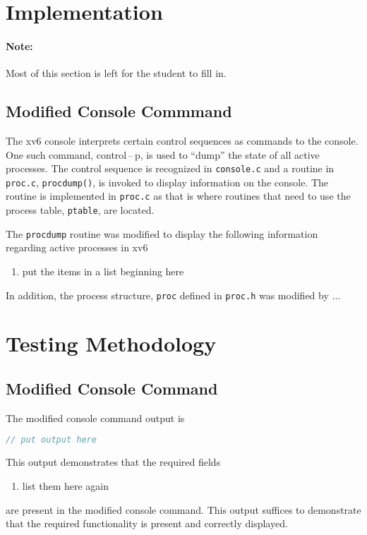 \documentclass[12pt,letterpaper]{report}
\begin{document}
	
	
	\section*{Implementation}
	
	\paragraph{Note:}Most of this section is left for the student to fill in.
	
	\subsection*{Modified Console Commmand}
	The xv6 console interprets certain control sequences as commands to the console. One such command, control\,--\,p, is used to ``dump'' the state of all active processes. The control sequence is recognized in \texttt{console.c} and a routine in \texttt{proc.c}, \texttt{procdump()}, is invoked to display information on the console. The routine is implemented in \texttt{proc.c} as that is where  routines that need to use the process table, \texttt{ptable}, are located.
	
	The \texttt{procdump} routine was modified to display the following information regarding active processes in xv6
	\begin{enumerate}
	\item put the items in a list beginning here
	\end{enumerate}
	
	In addition, the process structure, \texttt{proc} defined in \texttt{proc.h} was modified by $\ldots$
	
	
	\section*{Testing Methodology}
	
	\subsection*{Modified Console Command}
	The modified console command output is
\begin{lstlisting}[language=C]
// put output here
\end{lstlisting}

	This output demonstrates that the required fields
	\begin{enumerate}
	\item list them here again
	\end{enumerate}
	are present in the modified console command. This output suffices to demonstrate that the required functionality is present and correctly displayed.
	
\end{document}
